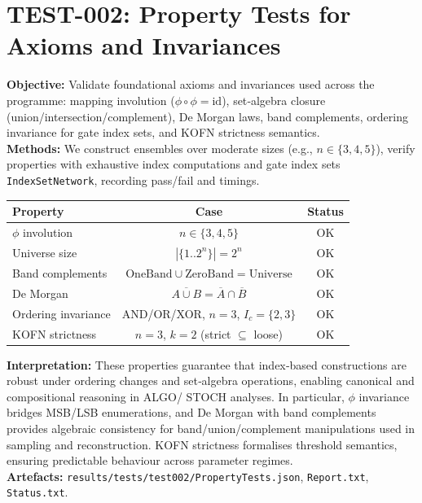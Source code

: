 \documentclass[11pt]{article}
\begin{document}
\section{TEST-002: Property Tests for Axioms and Invariances}
\textbf{Objective:} Validate foundational axioms and invariances used across the programme: mapping involution ($\phi\circ\phi=\mathrm{id}$), set‑algebra closure (union/intersection/complement), De Morgan laws, band complements, ordering invariance for gate index sets, and KOFN strictness semantics.\\
\textbf{Methods:} We construct ensembles over moderate sizes (e.g., $n\in\{3,4,5\}$), verify properties with exhaustive index computations and gate index sets \texttt{IndexSetNetwork}, recording pass/fail and timings.\\
\begin{center}
\begin{tabular}{lcc}
\toprule
Property & Case & Status \\
\midrule
$\phi$ involution & $n\in\{3,4,5\}$ & OK \\
Universe size & $|\{1..2^n\}|=2^n$ & OK \\
Band complements & $\mathrm{OneBand}\cup\mathrm{ZeroBand}=\mathrm{Universe}$ & OK \\
De Morgan & $\overline{A\cup B}=\overline{A}\cap\overline{B}$ & OK \\
Ordering invariance & AND/OR/XOR, $n=3$, $I_c=\{2,3\}$ & OK \\
KOFN strictness & $n=3$, $k=2$ (strict $\subseteq$ loose) & OK \\
\bottomrule
\end{tabular}
\end{center}
\textbf{Interpretation:} These properties guarantee that index‑based constructions are robust under ordering changes and set‑algebra operations, enabling canonical and compositional reasoning in ALGO/ STOCH analyses. In particular, $\phi$ invariance bridges MSB/LSB enumerations, and De Morgan with band complements provides algebraic consistency for band/union/complement manipulations used in sampling and reconstruction. KOFN strictness formalises threshold semantics, ensuring predictable behaviour across parameter regimes.\\
\textbf{Artefacts:} \texttt{results/tests/test002/PropertyTests.json}, \texttt{Report.txt}, \texttt{Status.txt}.
\end{document}
